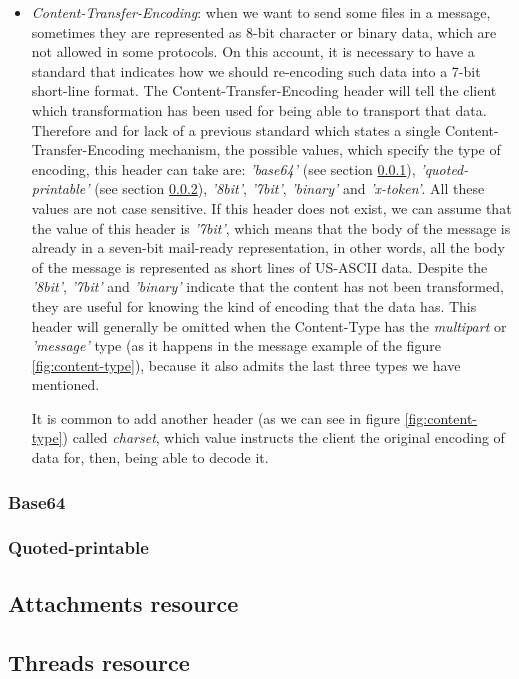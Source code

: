 \begin{itemize}
	\item\textit{Content-Transfer-Encoding}: when we want to send some files in a message, sometimes they are represented as 8-bit character or binary data, which are not allowed in some protocols. On this account, it is necessary to have a standard that indicates how we should re-encoding such data into a 7-bit short-line format. The Content-Transfer-Encoding header \citep{w3cte} will tell the client which transformation has been used for being able to transport that data. Therefore and for lack of a previous standard which states a single Content-Transfer-Encoding mechanism, the possible values, which specify the type of encoding, this header can take are: \textit{'base64'} (see section \ref{sssect:base64}), \textit{'quoted-printable'} (see section \ref{sssect:quot-p}), \textit{'8bit'}, \textit{'7bit'}, \textit{'binary'} and \textit{'x-token'}. All these values are not case sensitive. If this header does not exist, we can assume that the value of this header is \textit{'7bit'}, which means that the body of the message is already in a seven-bit mail-ready representation, in other words, all the body of the message is represented as short lines of US-ASCII data. Despite the \textit{'8bit'}, \textit{'7bit'} and \textit{'binary'} indicate that the content has not been transformed, they are useful for knowing the kind of encoding that the data has. This header will generally be omitted when the Content-Type has the \textit{multipart} or \textit{'message'} type (as it happens in the message example of the figure \ref{fig:content-type}), because it also admits the last three types we have mentioned.
	
	It is common to add another header (as we can see in figure \ref{fig:content-type}) called \textit{charset}, which value instructs the client the original encoding of data for, then, being able to decode it.
\end{itemize}

\subsubsection{Base64} \label{sssect:base64}

\subsubsection{Quoted-printable} \label{sssect:quot-p}

\subsection{Attachments resource} \label{ssect:attres}

\subsection{Threads resource}\label{ssect:threads}

